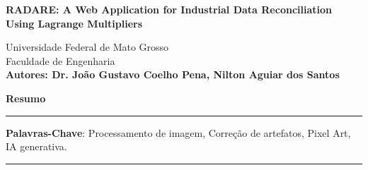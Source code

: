 \begin{titlepage}
    \begin{center}
        \LARGE
        \textbf{RADARE: A Web Application for Industrial Data Reconciliation Using Lagrange Multipliers}
        
        \vspace{1cm}
        \large
        Universidade Federal de Mato Grosso \\
        Faculdade de Engenharia \\

        \textbf{Autores: Dr. João Gustavo Coelho Pena, Nilton Aguiar dos Santos} \\

        
        \vfill
        \normalsize
        
        \vspace{2cm}
        \begin{minipage}{0.9\textwidth}
        \textbf{Resumo} \\
            \rule{\textwidth}{0.4pt}
            \small
            
            \vspace{0.5cm}
            
            \textbf{Palavras-Chave}: Processamento de imagem, Correção de artefatos, Pixel Art, IA generativa.
            
            \rule{\textwidth}{0.4pt}
        \end{minipage}
        
        
    \end{center}
\end{titlepage}
